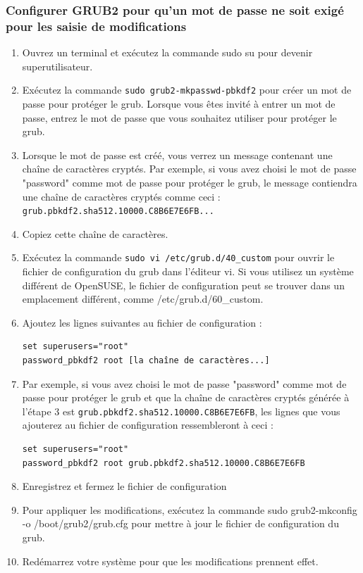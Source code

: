 \documentclass[12pt,a4paper]{article}
\newcommand{\code}[1]{\colorbox{light-gray}{\texttt{#1}}}
\begin{document}
        \subsubsection{Configurer GRUB2 pour qu'un mot de passe ne soit exigé pour les saisie de modifications} 
        \begin{enumerate}
            \item Ouvrez un terminal et exécutez la commande sudo su pour devenir superutilisateur.
            \item Exécutez la commande \code{sudo grub2-mkpasswd-pbkdf2} pour créer un mot de passe pour protéger le grub. Lorsque vous êtes invité à entrer un mot de passe, entrez le mot de passe que vous souhaitez utiliser pour protéger le grub.
            \item Lorsque le mot de passe est créé, vous verrez un message contenant une chaîne de caractères cryptés. Par exemple, si vous avez choisi le mot de passe "password" comme mot de passe pour protéger le grub, le message contiendra une chaîne de caractères cryptés comme ceci : \code{grub.pbkdf2.sha512.10000.C8B6E7E6FB...}
            \item Copiez cette chaîne de caractères.
            \item Exécutez la commande \code{sudo vi /etc/grub.d/40\_custom} pour ouvrir le fichier de configuration du grub dans l'éditeur vi. Si vous utilisez un système différent de OpenSUSE, le fichier de configuration peut se trouver dans un emplacement différent, comme /etc/grub.d/60\_custom.
            \item Ajoutez les lignes suivantes au fichier de configuration :
            \begin{lstlisting}
set superusers="root"
password_pbkdf2 root [la chaîne de caractères...]
            \end{lstlisting}
            \item Par exemple, si vous avez choisi le mot de passe "password" comme mot de passe pour protéger le grub et que la chaîne de caractères cryptés générée à l'étape 3 est \code{grub.pbkdf2.sha512.10000.C8B6E7E6FB}, les lignes que vous ajouterez au fichier de configuration ressembleront à ceci :
            \begin{lstlisting}
set superusers="root"
password_pbkdf2 root grub.pbkdf2.sha512.10000.C8B6E7E6FB
            \end{lstlisting}
            \item Enregistrez et fermez le fichier de configuration
            \item Pour appliquer les modifications, exécutez la commande sudo grub2-mkconfig -o /boot/grub2/grub.cfg pour mettre à jour le fichier de configuration du grub.
            \item Redémarrez votre système pour que les modifications prennent effet.
        \end{enumerate}
        
\end{document}
